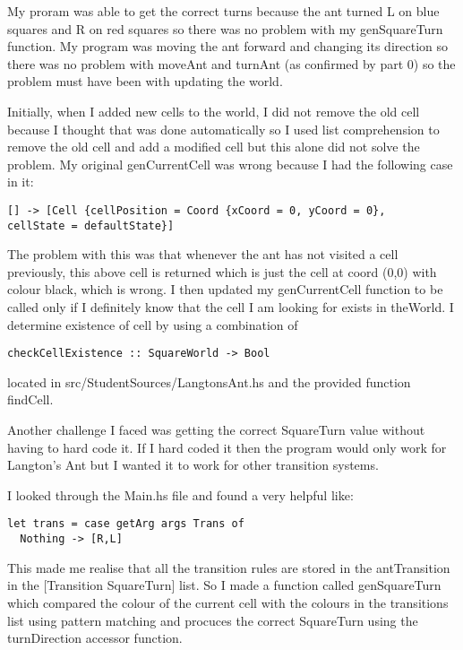 \documentclass[12pt]{article}
\begin{document}
My proram was able to get the correct turns because the ant turned L on blue squares and R on red squares so there was no problem with my genSquareTurn function. My program was moving the ant forward and changing its direction so there was no problem with moveAnt and turnAnt (as confirmed by part 0) so the problem must have been with updating the world.

Initially, when I added new cells to the world, I did not remove the old cell because I thought that was done automatically so I used list comprehension to remove the old cell and add a modified cell but this alone did not solve the problem. My original genCurrentCell was wrong because I had the following case in it:

\begin{lstlisting}
[] -> [Cell {cellPosition = Coord {xCoord = 0, yCoord = 0},
cellState = defaultState}]
\end{lstlisting}

The problem with this was that whenever the ant has not visited a cell previously, this above cell is returned which is just the cell at coord (0,0) with colour black, which is wrong. I then updated my genCurrentCell function to be called only if I definitely know that the cell I am looking for exists in theWorld. I determine existence of cell by using a combination of

\begin{lstlisting}
checkCellExistence :: SquareWorld -> Bool
\end{lstlisting}

located in src/StudentSources/LangtonsAnt.hs and the provided function findCell.

\hfill

Another challenge I faced was getting the correct SquareTurn value without having to hard code it. If I hard coded it then the program would only work for Langton's Ant but I wanted it to work for other transition systems.

I looked through the Main.hs file and found a very helpful like:

\begin{lstlisting}
let trans = case getArg args Trans of
  Nothing -> [R,L]
\end{lstlisting}

This made me realise that all the transition rules are stored in the antTransition in the [Transition SquareTurn] list. So I made a function called genSquareTurn which compared the colour of the current cell with the colours in the transitions list using pattern matching and procuces the correct SquareTurn using the turnDirection accessor function.
\end{document}
